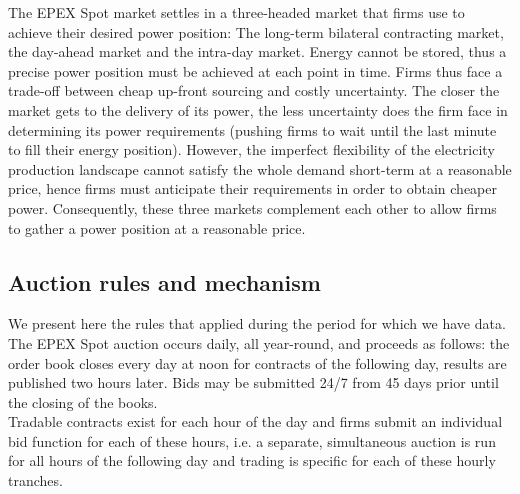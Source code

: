 
The EPEX Spot market settles in a three-headed market that firms use to achieve their desired power position: The long-term bilateral contracting market, the day-ahead market and the intra-day market. Energy cannot be stored, thus a precise power position must be achieved at each point in time. Firms thus face a trade-off between cheap up-front sourcing and costly uncertainty. The closer the market gets to the delivery of its power, the less uncertainty does the firm face in determining its power requirements (pushing firms to wait until the last minute to fill their energy position). However, the imperfect flexibility of the electricity production landscape cannot satisfy the whole demand short-term at a reasonable price, hence firms must anticipate their requirements in order to obtain cheaper power. Consequently, these three markets complement each other to allow firms to gather a power position at a reasonable price. 


\subsection{Auction rules and mechanism}
\label{epexrules}
We present here the rules that applied during the period for which we have data. \\

The EPEX Spot auction occurs daily, all year-round, and proceeds as follows: the order book closes every day at noon for contracts of the following day, results are published two hours later. Bids may be submitted 24/7 from 45 days prior until the closing of the books. \\

Tradable contracts exist for each hour of the day and firms submit an individual bid function for each of these hours, i.e. a separate, simultaneous auction is run for all hours of the following day and trading is specific for each of these hourly tranches.  \\

